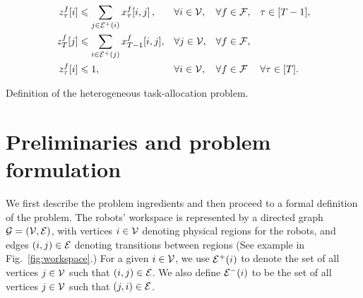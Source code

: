 \documentclass[conference]{IEEEtran}
\begin{document}
\begin{table}[!ht]
{\begin{minipage}[t]{1\textwidth - 2\fboxsep - 2\fboxrule}
\begin{subequations}
\begin{align}
          z^f_\tau[i] & \leqslant  \sum_{j\in \mathcal{E}^+(i)} x^f_\tau[i,j] \thinspace, & & \forall i \in \mathcal{V},  & &  \forall f\in\mathcal{F}, && \tau\in [T-1], \label{eq:bound_z_1} \\ 
          z^f_T[j] & \leqslant   \sum_{i\in \mathcal{E}^+(j)} x^f_{T-1}[i,j], & & \forall j \in \mathcal{V}, & &  \forall f\in\mathcal{F},  \label{eq:bound_z_2} \\ 
          z^f_\tau[i] & \leqslant 1 , && \forall i\in \mathcal{V}, && \forall f\in \mathcal{F} && \forall\tau\in [T]. \label{eq:bound_z_3}
        \end{align}
      \end{subequations}
    \end{minipage}}
\vspace{5pt}
\caption{Definition of the heterogeneous task-allocation problem.}
\label{tbl:heterogeneous}
\end{table}


\section{Preliminaries and problem formulation \label{sec:problem_statement}}
We first describe the problem ingredients and then proceed to a formal definition of the problem.
%
%
The robots' workspace is represented by a directed graph $\mathcal{G}=(\mathcal{V},\mathcal{E})$, with vertices $i\in \mathcal{V}$ denoting physical regions for the robots, and edges $(i,j)\in \mathcal{E}$ denoting transitions between regions (See example in Fig.~\ref{fig:workspace}.) For a given $i\in \mathcal{V}$, we use $\mathcal{E}^+(i)$ to denote the set of all vertices $j \in \mathcal{V}$ such that $(i,j)\in \mathcal{E}$. We also define $\mathcal{E}^-(i)$ to be the set of all vertices $j \in \mathcal{V}$ such that $(j,i)\in \mathcal{E}$.
\end{document}
